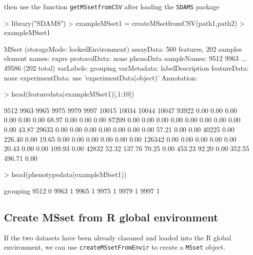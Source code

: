 \documentclass[12pt]{article}
\begin{document}
then use the function {\tt getMSsetfromCSV} after loading the {\tt SDAMS} 
package
\begin{Schunk}
\begin{Sinput}
> library("SDAMS")
> exampleMSset1 = createMSsetfromCSV(path1,path2)
> exampleMSset1
\end{Sinput}
\begin{Soutput}
MSset (storageMode: lockedEnvironment)
assayData: 560 features, 202 samples 
  element names: exprs 
protocolData: none
phenoData
  sampleNames: 9512 9963 ... 49586 (202 total)
  varLabels: grouping
  varMetadata: labelDescription
featureData: none
experimentData: use 'experimentData(object)'
Annotation:  
\end{Soutput}
\begin{Sinput}
> head(featuredata(exampleMSset1)[,1:10])
\end{Sinput}
\begin{Soutput}
        9512   9963  9965  9975   9979  9997 10015  10034  10044 10047
93922   0.00   0.00  0.00  0.00   0.00  0.00 68.97   0.00   0.00  0.00
87209   0.00   0.00  0.00  0.00   0.00  0.00  0.00   0.00   0.00 43.87
29633   0.00   0.00  0.00  0.00   0.00  0.00  0.00  57.21   0.00  0.00
40225   0.00 226.40  0.00 19.65   0.00  0.00  0.00   0.00   0.00  0.00
126342  0.00   0.00  0.00  0.00   0.00 20.43  0.00   0.00 109.93  0.00
42832  52.32 137.76 70.25  0.00 453.23 92.20  0.00 352.55 496.71  0.00
\end{Soutput}
\begin{Sinput}
> head(phenotypedata(exampleMSset1))
\end{Sinput}
\begin{Soutput}
     grouping
9512        0
9963        1
9965        1
9975        1
9979        1
9997        1
\end{Soutput}
\end{Schunk}



\subsection{Create MSset from R global environment}
If the two datasets have been already claeaned and loaded into the R global
environment, we can use {\tt createMSsetFromEnvir} to create a {\tt MSset} object.
\end{document}
